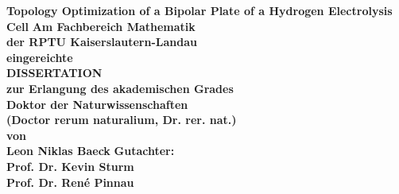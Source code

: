 \begin{titlepage}
    \begin{center}
        \linespread{1.5}
        \phantom{hallo}
        \vspace{15mm}
        \huge
        \textbf{Topology Optimization of a Bipolar Plate of a Hydrogen Electrolysis Cell}
        \vspace{20mm}
        \normalsize
        \textbf{Am Fachbereich Mathematik} \\
        \textbf{der RPTU Kaiserslautern-Landau} \\
        \textbf{eingereichte} \\
        \vspace{5mm}
        \Large
        \textbf{DISSERTATION} \\
        \vspace{5mm}
        \normalsize
        \textbf{zur Erlangung des akademischen Grades}\\
        \vspace{5mm}
        \textbf{Doktor der Naturwissenschaften} \\
        \textbf{(Doctor rerum naturalium, Dr. rer. nat.)} \\
        \vspace{5mm}
        \textbf{von} \\
        \vspace{5mm}
        \Large
        \textbf{Leon Niklas Baeck}
        \vspace{10mm}
        \normalsize
        \textbf{Gutachter:}\\
        \textbf{Prof. Dr. Kevin Sturm} \\
        \textbf{Prof. Dr. Ren\'e Pinnau}
    \end{center}
\end{titlepage}

